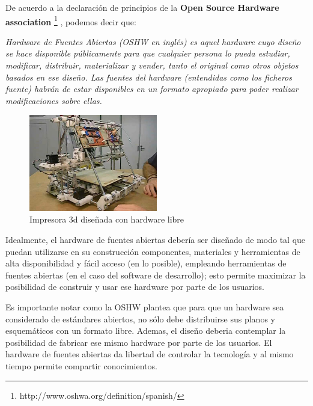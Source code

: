 De acuerdo a la declaración de principios de la \textbf{Open Source Hardware association} \footnote{http://www.oshwa.org/definition/spanish/} , podemos decir que:

\begin{center}
\textit{
Hardware de Fuentes Abiertas (OSHW en inglés) es aquel hardware cuyo diseño se hace disponible públicamente para que cualquier persona lo pueda estudiar, modificar, distribuir, materializar y vender, tanto el original como otros objetos basados en ese diseño. Las fuentes del hardware (entendidas como los ficheros fuente) habrán de estar disponibles en un formato apropiado para poder realizar modificaciones sobre ellas.
}
\end{center}


\begin{figure}
  \begin{center}
    \includegraphics[width=0.5\textwidth]{figuras/reprap.jpg}
    \caption[Caption for LOF]{Impresora 3d diseñada con hardware libre}
       
    \label{fig:reprap }
  \end{center}
\end{figure}


Idealmente, el hardware de fuentes abiertas debería ser diseñado de modo tal que puedan utilizarse en su construcción componentes, materiales y herramientas de alta disponibilidad y fácil acceso (en lo posible), empleando herramientas de fuentes abiertas (en el caso del software de desarrollo); esto permite maximizar la posibilidad de construir y usar ese hardware por parte de los usuarios. 

Es importante notar como la OSHW plantea que para que un hardware sea considerado de estándares abiertos, no sólo debe distribuirse  sus planos y esquemáticos con un formato libre. Ademas, el diseño deberia contemplar la posibilidad de fabricar ese mismo hardware por parte de los usuarios. El hardware de fuentes abiertas da libertad de controlar la tecnología y al mismo tiempo permite compartir conocimientos.

